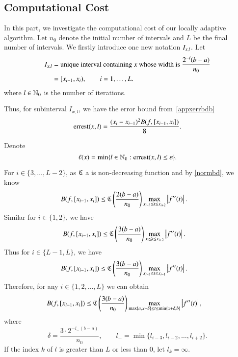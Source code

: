 \subsection{Computational Cost}

In this part, we investigate the computational cost of our locally adaptive algorithm. Let $n_0$ denote the initial number of intervals and $L$ be the final number of intervals. We firstly introduce one new notation $I_{x,l}$. Let
\begin{align*}
I_{x,l} & = \text{unique interval containing $x$ whose width is $\frac{2^{-l}(b-a)}{n_0}$}\\
& = [x_{i-1},x_i), \qquad i =1,\ldots,L.
\end{align*}
where $l \in \mathbb{N}_{0}$ is the number of iterations.

Thus, for subinterval $I_{x,l}$, we have the error bound from~\eqref{appxerrbdb}
$$\operatorname{errest}(x,l)=\frac{(x_i - x_{i-1})^2B(f,[x_{i-1},x_i])}{8}.$$

Denote
\begin{equation}\label{eqn:defofsmallellx}
\ell(x) = \min \{ l \in \mathbb{N}_{0} : \operatorname{errest}(x,l) \le \varepsilon\}.
\end{equation}

For $i \in \{3, \ldots, L-2\}$,  as $\mathfrak{C}$ a is non-decreasing function and by \eqref{normbd}, we know
\begin{align*}
B(f,[x_{i-1},x_i]) & \le \mathfrak{C}\left(\frac{2(b-a)}{n_0}\right) \max\limits_{x_{i-3}\le t \le x_{i+2}}\left \lvert f''(t) \right \rvert.
\end{align*}
Similar for $i\in \{1,2\}$, we have
\begin{align*}
B(f,[x_{i-1},x_i]) & \le \mathfrak{C}\left(\frac{3(b-a)}{n_0}\right) \max\limits_{x_{i}\le t \le x_{i+2}}\left \lvert f''(t) \right \rvert.
\end{align*}
Thus for $i \in \{L-1,L\}$, we have
\begin{align*}
B(f,[x_{i-1},x_i]) & \le \mathfrak{C}\left(\frac{3(b-a)}{n_0}\right) \max\limits_{x_{i-3}\le t \le x_{i-1}}\left \lvert f''(t) \right \rvert.
\end{align*}
Therefore, for any $i \in \{1,2,\ldots, L\}$ we can obtain
\begin{align*}
B(f,[x_{i-1},x_i]) & \le \mathfrak{C}\left(\frac{3(b-a)}{n_0}\right) \max\limits_{\max\{a,x-\delta\} \le t \le \min\{x+\delta, b\}}\left \lvert f''(t) \right \rvert,
\end{align*}
where 
\[\delta = \frac{3\cdot 2^{-l_{-}(b-a)}}{n_0}, \qquad l_{-}=\min\{l_{i-3},l_{i-2},\ldots,l_{i+2}\}.\]
If the index $k$ of $l$ is greater than $L$ or less than $0$, let $l_k=\infty$.

